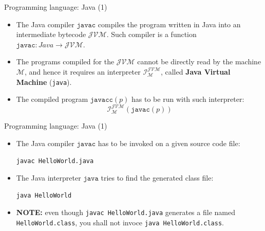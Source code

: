 \documentclass{beamer}
\begin{document}
\begin{frame}{Programming language: Java (1)}
	\begin{itemize}
		\item The Java compiler $\texttt{javac}$ compiles the program written in Java into an intermediate bytecode $\mathcal{JVM}$. Such compiler is a function $\texttt{javac}\colon Java\to \mathcal{JVM}$.
		\item The programs compiled for the $\mathcal{JVM}$ cannot be directly read by the machine $\mathcal{M}$, and hence it requires an interpreter $\mathcal{I}_{\mathcal{M}}^{\mathcal{JVM}}$, called \textbf{Java Virtual Machine} (\texttt{java}).
		\item The compiled program $\texttt{javacc}(p)$ has to be run with such interpreter:
		\[\mathcal{I}_{\mathcal{M}}^{\mathcal{JVM}}(\texttt{javac}(p))\]
	\end{itemize}
\end{frame}

\begin{frame}{Programming language: Java (1)}
	\begin{itemize}
		\item The Java compiler $\texttt{javac}$ has to be invoked on a given source code file:
		\begin{center}
			\texttt{javac HelloWorld.java}
		\end{center}
		\item The Java interpreter $\texttt{java}$ tries to find the generated class file:
		\begin{center}
			\texttt{java HelloWorld}
		\end{center}
		\item \textbf{NOTE:} even though \texttt{javac HelloWorld.java} generates a file named \texttt{HelloWorld.class}, you shall not invoce \texttt{java HelloWorld.class}.
	\end{itemize}
\end{frame}
\end{document}
